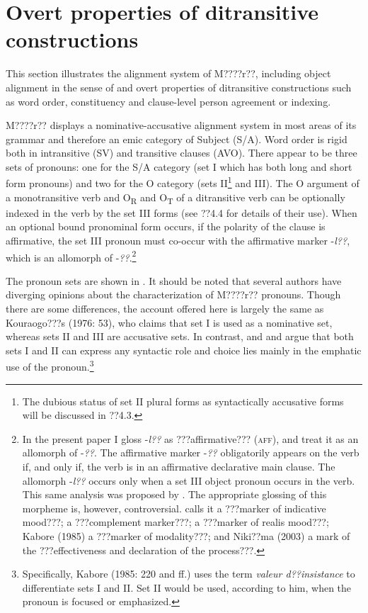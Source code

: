 \documentclass[output=paper]{langsci/langscibook}
\begin{document}
\section{Overt properties of ditransitive constructions }

This section illustrates the alignment system of M????r??, including object alignment in the sense of \citet{MalchukovEtAl2010} and overt properties of ditransitive constructions such as word order, constituency and clause-level person agreement or indexing.


M????r?? displays a nominative-accusative alignment system in most areas of its grammar and therefore an emic category of Subject (S/A). Word order is rigid both in intransitive (SV) and transitive clauses (AVO). There appear to be three sets of pronouns: one for the S/A category (set I which has both long and short form pronouns) and two for the O category (sets II\footnote{ The dubious status of set II plural forms as syntactically accusative forms will be discussed in ??4.3.}{ }and III). The O argument of a monotransitive verb and O\textsubscript{R} and O\textsubscript{T} of a ditransitive verb can be optionally indexed in the verb by the set III forms (see ??4.4 for details of their use). When an optional bound pronominal form occurs, if the polarity of the clause is affirmative, the set III pronoun must co-occur with the affirmative marker -\textit{l??}, which is an allomorph of -\textit{??}.\footnote{{In the present paper I gloss -}{\textit{l??}}{ as ???affirmative??? (}{\textsc{aff}}{), and treat it as an allomorph of -}{\textit{??}}{. The affirmative marker -}{\textit{??}}{ obligatorily appears on the verb if, and only if, the verb is in an affirmative declarative main clause. The allomorph -}{\textit{l??}}{ occurs only when a set III object pronoun occurs in the verb. This same analysis was proposed by \citet{Manessy1963}. The appropriate glossing of this morpheme is, however, controversial. \citet[96]{Alexandre1953} calls it a ???marker of indicative mood???; \citet[112]{Peterson1971} a ???complement marker???; \citet{Canu1976} a ???marker of realis mood???; Kabore} {(1985) a ???marker of modality???; and Niki??ma (2003) a mark of the ???effectiveness and declaration of the process???.}} 

The pronoun sets are shown in . It should be noted that several authors have diverging opinions about the characterization of M????r?? pronouns. Though there are some differences, the account offered here is largely the same as Kouraogo???s (1976: 53), who claims that set I is used as a nominative set, whereas sets II and III are accusative sets. In contrast, \citet{Canu1974} and \citet{Kabore1985} and argue that both sets I and II can express any syntactic role and choice lies mainly in the emphatic use of the pronoun.\footnote{ Specifically, Kabore (1985: 220 and ff.) uses the term \textit{valeur d??insistance} to differentiate sets I and II. Set II would be used, according to him, when the pronoun is focused or emphasized. }{ }
\end{document}
